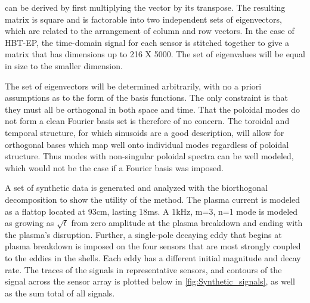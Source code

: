   can be derived by first multiplying the vector by its transpose.  The resulting matrix is square and is factorable into two independent sets of eigenvectors, which are related to the arrangement of column and row vectors.  
In the case of HBT-EP, the time-domain signal for each sensor is stitched together to give a matrix that has dimensions up to 216 X 5000.  The set of eigenvalues will be equal in size to the smaller dimension.  \par
The set of eigenvectors will be determined arbitrarily, with no a priori assumptions as to the form of the basis functions.  The only constraint is that they must all be orthogonal in both space and time.  That the poloidal modes do not form a clean Fourier basis set is therefore of no concern.  The toroidal and temporal structure, for which sinusoids are a good description, will allow for orthogonal bases which map well onto individual modes regardless of poloidal structure.  Thus modes with non-singular poloidal spectra can be well modeled, which would not be the case if a Fourier basis was imposed.\par
A set of synthetic data is generated and analyzed with the biorthogonal decomposition to show the utility of the method.  The plasma current is modeled as a flattop located at 93cm, lasting 18ms. A 1kHz, m=3, n=1 mode is modeled as growing as $\sqrt{t}$ from zero amplitude at the plasma breakdown and ending with the plasma's disruption.  Further, a single-pole decaying eddy that begins at plasma breakdown is imposed on the four sensors that are most strongly coupled to the eddies in the shells.  Each eddy has a different initial magnitude and decay rate.  The traces of the signals in representative sensors, and contours of the signal across the sensor array is plotted below in \ref{fig:Synthetic_signals}, as well as the sum total of all signals. 

